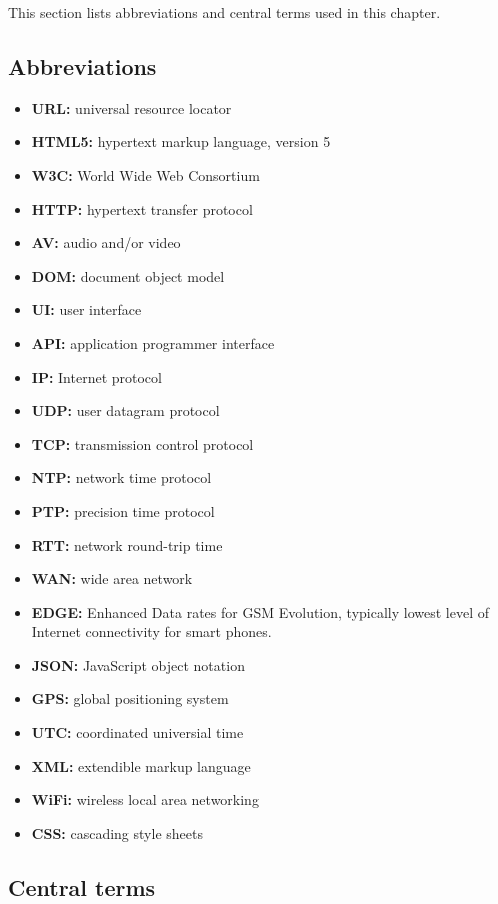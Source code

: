 This section lists abbreviations and central terms used in this chapter.

\subsection{Abbreviations}

\begin{itemize}
\item{\textbf{URL:} universal resource locator}
\item{\textbf{HTML5:} hypertext markup language, version 5}
\item{\textbf{W3C:} World Wide Web Consortium}
\item{\textbf{HTTP:} hypertext transfer protocol}
\item{\textbf{AV:} audio and/or video}
\item{\textbf{DOM:} document object model}
\item{\textbf{UI:} user interface}
\item{\textbf{API:} application programmer interface}
\item{\textbf{IP:} Internet protocol}
\item{\textbf{UDP:} user datagram protocol}
\item{\textbf{TCP:} transmission control protocol}
\item{\textbf{NTP:} network time protocol}
\item{\textbf{PTP:} precision time protocol}
\item{\textbf{RTT:} network round-trip time}
\item{\textbf{WAN:} wide area network}
\item{\textbf{EDGE:} Enhanced Data rates for GSM Evolution, typically lowest level of Internet connectivity for smart phones.}
\item{\textbf{JSON:} JavaScript object notation}
\item{\textbf{GPS:} global positioning system}
\item{\textbf{UTC:} coordinated universial time}
\item{\textbf{XML:} extendible markup language}
\item{\textbf{WiFi:} wireless local area networking}
\item{\textbf{CSS:}} cascading style sheets
\end{itemize}


\subsection{Central terms}

